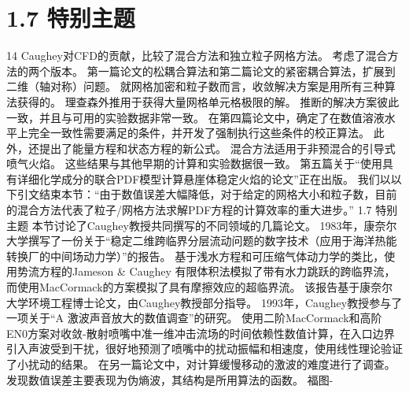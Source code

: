 \documentclass[UTF8,11pt,a4paper,openany,fontset=fandol]{ctexbook}
\begin{document}
\section{1.7 特别主题}
14 Caughey对CFD的贡献，比较了混合方法和独立粒子网格方法。 考虑了混合方法的两个版本。 第一篇论文的松耦合算法和第二篇论文的紧密耦合算法，扩展到二维（轴对称）问题。 就网格加密和粒子数而言，收敛解决方案是用所有三种算法获得的。 理查森外推用于获得大量网格单元格极限的解。 推断的解决方案彼此一致，并且与可用的实验数据非常一致。 在第四篇论文中，确定了在数值溶液水平上完全一致性需要满足的条件，并开发了强制执行这些条件的校正算法。 此外，还提出了能量方程和状态方程的新公式。 混合方法适用于非预混合的引导式喷气火焰。 这些结果与其他早期的计算和实验数据很一致。 第五篇关于“使用具有详细化学成分的联合PDF模型计算悬崖体稳定火焰的论文”正在出版。 我们以以下引文结束本节：“由于数值误差大幅降低，对于给定的网格大小和粒子数，目前的混合方法代表了粒子/网格方法求解PDF方程的计算效率的重大进步。” 1.7 特别主题 本节讨论了Caughey教授共同撰写的不同领域的几篇论文。 1983年，康奈尔大学撰写了一份关于“稳定二维跨临界分层流动问题的数字技术（应用于海洋热能转换厂的中间场动力学）”的报告。 基于浅水方程和可压缩气体动力学的类比，使用势流方程的Jameson \& Caughey 有限体积法模拟了带有水力跳跃的跨临界流，而使用MacCormack的方案模拟了具有摩擦效应的超临界流。 该报告基于康奈尔大学环境工程博士论文，由Caughey教授部分指导。 1993年，Caughey教授参与了一项关于“A 激波声音放大的数值调查”的研究。 使用二阶MacCormack和高阶EN0方案对收敛-散射喷嘴中准一维冲击流场的时间依赖性数值计算，在入口边界引入声波受到干扰，很好地预测了喷嘴中的扰动振幅和相速度，使用线性理论验证了小扰动的结果。 在另一篇论文中，对计算缓慢移动的激波的难度进行了调查。 发现数值误差主要表现为伪熵波，其结构是所用算法的函数。 福图-
\end{document}
